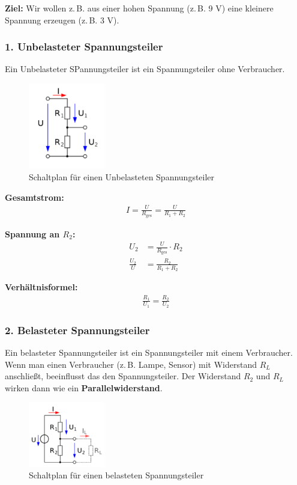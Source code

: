 \documentclass{scrartcl}
\begin{document}
\vspace{1em}

\noindent \textbf{Ziel:} Wir wollen z.\,B. aus einer hohen Spannung (z.\,B. 9 V) eine kleinere Spannung erzeugen (z.\,B. 3 V).

\subsubsection*{1. Unbelasteter Spannungsteiler}
Ein Unbelasteter SPannungsteiler ist ein Spannungsteiler ohne Verbraucher.
\begin{figure}[H]
    \centering
    \includegraphics[width=0.3\textwidth]{spannungsteiler 1.png}
    \caption{Schaltplan für einen Unbelasteten Spannungsteiler}
\end{figure}

\textbf{Gesamtstrom:}
\begin{align}
    I =\frac{U}{R_\text{ges}}= \frac{U}{R_1 + R_2}
\end{align}



\textbf{Spannung an $R_2$:}
\begin{align}
U_2 &= \frac{U}{R_\text{ges}}\cdot R_2\\
  \frac{U_2}{U}  &=\frac{R_2}{R_1+R_2}
\end{align}

\textbf{Verhältnisformel:}
\begin{align}
    \frac{R_1}{U_1}=\frac{R_2}{U_2}
\end{align}

\subsubsection*{2. Belasteter Spannungsteiler}
Ein belasteter Spannungsteiler ist ein Spannungsteiler mit einem Verbraucher.
Wenn man einen Verbraucher (z.\,B. Lampe, Sensor) mit Widerstand $R_L$ anschließt, beeinflusst das den Spannungsteiler. Der Widerstand $R_2$ und $R_L$ wirken dann wie ein \textbf{Parallelwiderstand}.

\begin{figure}[H]
    \centering
    \includegraphics[width=0.3\textwidth]{spannungsteiler 2.png}
    \caption{Schaltplan für einen belasteten Spannungsteiler}
\end{figure}
\end{document}
